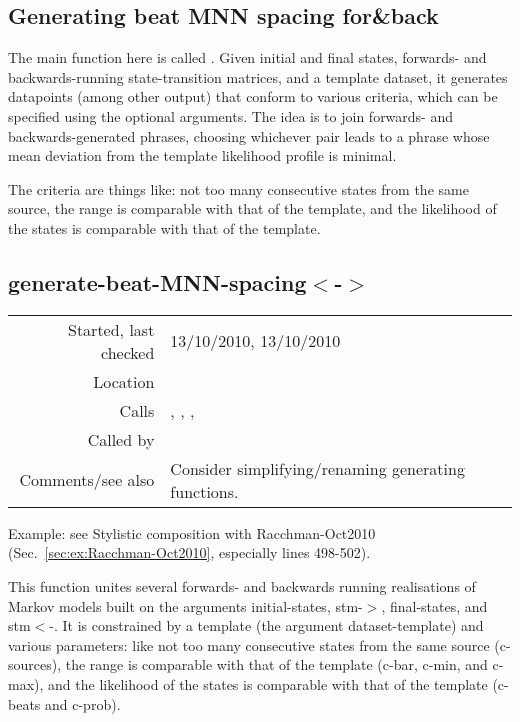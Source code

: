 \subsection{Generating beat MNN spacing for\&back}\label{sec:generating-beat-MNN-spacing-for-and-back}

The main function here is called
. Given initial and final
states, forwards- and backwards-running
state-transition matrices, and a template dataset, it
generates datapoints (among other output) that conform
to various criteria, which can be specified using the
optional arguments. The idea is to join forwards- and
backwards-generated phrases, choosing whichever pair
leads to a phrase whose mean deviation from the
template likelihood profile is minimal.

The criteria are things like: not too many consecutive
states from the same source, the range is comparable
with that of the template, and the likelihood of the
states is comparable with that of the template.


\subsection*{generate-beat-MNN-spacing$<$-$>$}\label{fun:generate-beat-MNN-spacing<->}

\vspace{0.3cm}
\begin{tabular}{r|p{8cm}}
Started, last checked & 13/10/2010, 13/10/2010 \\
Location & \nameref{sec:generating-beat-MNN-spacing-for-and-back} \\
Calls & \nameref{fun:generate-forwards-or-backwards-no-failure}, \nameref{fun:my-last}, \nameref{fun:segments-strict}, \nameref{fun:unite-datapoints} \\
Called by & \\
Comments/see also & Consider simplifying/renaming generating functions.
\end{tabular}

\vspace{0.5cm}
\noindent Example: see Stylistic composition with
Racchman-Oct2010 (Sec.~\ref{sec:ex:Racchman-Oct2010},
especially lines 498-502).
\vspace{0.5cm}

\noindent This function unites several forwards- and
backwards running realisations of Markov models built
on the arguments initial-states, stm-$>$, final-states,
and stm$<$-. It is constrained by a template (the
argument dataset-template) and various parameters:
like not too many consecutive states from the same
source (c-sources), the range is comparable with that
of the template (c-bar, c-min, and c-max), and the
likelihood of the states is comparable with that of
the template (c-beats and c-prob).

